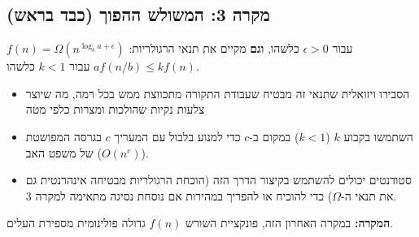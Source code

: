 \documentclass[11pt, a4paper]{article}
\begin{document}
\vspace{0.5cm}
\begin{center}
\end{center}
\vspace{0.5cm}

\subsection*{מקרה 3: המשולש ההפוך (כבד בראש)}

\begin{tcolorbox}[colback=accent2!10, colframe=accent2, title=\textbf{התנאי}]
$f(n) = \Omega(n^{\log_b a + \epsilon})$ עבור $\epsilon > 0$ כלשהו, \textbf{וגם} מקיים את תנאי הרגולריות: $a f(n/b) \le k f(n)$ עבור $k < 1$ כלשהו.
\end{tcolorbox}

\begin{educatortip}
\begin{itemize}
    \item  הסבירו ויזואלית שתנאי זה מבטיח שעבודת התקורה מתכווצת ממש בכל רמה, מה שיוצר צלעות
נקיות שהולכות ומצרות כלפי מטה
    \item השתמשו בקבוע $k$ ($k < 1$) במקום ב-$c$ כדי למנוע בלבול עם המעריך $c$ בגרסה המפושטת של משפט האב ($O(n^c)$).
    \item סטודנטים יכולים להשתמש בקיצור הדרך הזה (הוכחת הרגולריות מבטיחה אינהרנטית גם את תנאי ה-$\Omega$) כדי להוכיח או להפריך במהירות אם נוסחת נסיגה מתאימה למקרה 3.
\end{itemize}
\end{educatortip}

\textbf{המקרה:} במקרה האחרון הזה, פונקציית השורש $f(n)$ גדולה פולינומית מספירת העלים.
\end{document}
